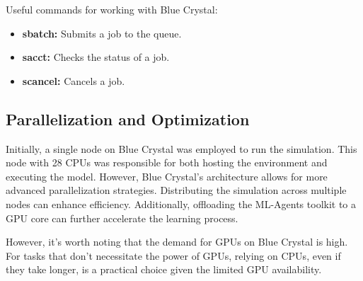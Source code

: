 Useful commands for working with Blue Crystal:

\begin{itemize}
    \item \textbf{sbatch:} Submits a job to the queue.
    \item \textbf{sacct:} Checks the status of a job.
    \item \textbf{scancel:} Cancels a job.
\end{itemize}

\subsection*{Parallelization and Optimization}

Initially, a single node on Blue Crystal was employed to run the simulation. This node with 28 CPUs was responsible for both hosting the environment and executing the model. However, Blue Crystal's architecture allows for more advanced parallelization strategies. Distributing the simulation across multiple nodes can enhance efficiency. Additionally, offloading the ML-Agents toolkit to a GPU core can further accelerate the learning process.

However, it's worth noting that the demand for GPUs on Blue Crystal is high. For tasks that don't necessitate the power of GPUs, relying on CPUs, even if they take longer, is a practical choice given the limited GPU availability.


